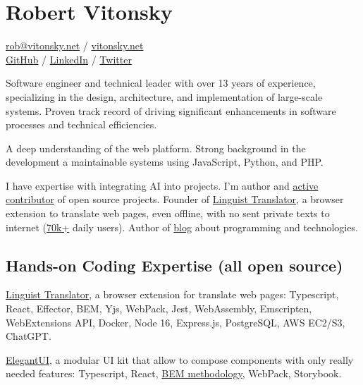 \documentclass{vitonsky}
\begin{document}
\vitonskyPrintPhoto{}

\section*{\Large{Robert Vitonsky}}

\href{mailto:rob@vitonsky.net}{rob@vitonsky.net} / \href{https://vitonsky.net}{vitonsky.net}\\%
\href{https://github.com/vitonsky}{GitHub} /
\href{https://www.linkedin.com/in/vitonsky}{LinkedIn} /
\href{https://twitter.com/intent/follow?screen_name=rvitonsky}{Twitter}

\vspace*{12pt}

Software engineer and technical leader with over 13 years of experience, specializing in the design, architecture, and implementation of large-scale systems. Proven track record of driving significant enhancements in software processes and technical efficiencies.

A deep understanding of the web platform. Strong background in the development a maintainable systems using JavaScript, Python, and PHP.

I have expertise with integrating AI into projects. I'm author and \href{https://github.com/vitonsky}{active contributor} of open source projects. Founder of \href{https://linguister.io}{Linguist Translator}, a browser extension to translate web pages, even offline, with no sent private texts to internet (\href{https://github.com/translate-tools/linguist}{70k+} daily users). Author of \href{https://vitonsky.net/}{blog} about programming and technologies.

\subsection*{Hands-on Coding Expertise (all open source)}

\href{https://github.com/translate-tools/linguist}{Linguist Translator}, a browser
extension for translate web pages: Typescript, React, Effector, BEM,
Yjs, WebPack, Jest, WebAssembly, Emscripten, WebExtensions API, Docker,
Node 16, Express.js, PostgreSQL, AWS EC2/S3, ChatGPT.

\href{https://github.com/vitonsky/react-elegant-ui}{ElegantUI}, a
modular UI kit that allow to compose components with only really needed features:
Typescript, React, \href{https://en.bem.info/methodology/quick-start/}{BEM methodology},
WebPack, Storybook.
\end{document}
